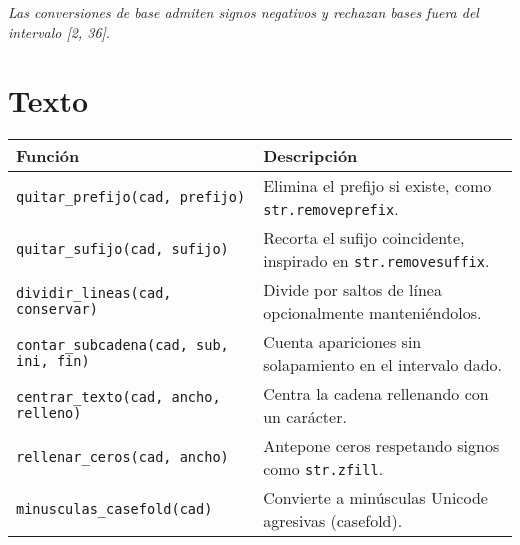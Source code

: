 \documentclass{article}
\begin{document}
\textit{Las conversiones de base admiten signos negativos y rechazan bases fuera del intervalo [2, 36].}

\section*{Texto}
\begin{tabular}{ll}
\textbf{Función} & \textbf{Descripción}\\\hline
\texttt{quitar\_prefijo(cad, prefijo)} & Elimina el prefijo si existe, como \texttt{str.removeprefix}.\\
\texttt{quitar\_sufijo(cad, sufijo)} & Recorta el sufijo coincidente, inspirado en \texttt{str.removesuffix}.\\
\texttt{dividir\_lineas(cad, conservar)} & Divide por saltos de línea opcionalmente manteniéndolos.\\
\texttt{contar\_subcadena(cad, sub, ini, fin)} & Cuenta apariciones sin solapamiento en el intervalo dado.\\
\texttt{centrar\_texto(cad, ancho, relleno)} & Centra la cadena rellenando con un carácter.\\
\texttt{rellenar\_ceros(cad, ancho)} & Antepone ceros respetando signos como \texttt{str.zfill}.\\
\texttt{minusculas\_casefold(cad)} & Convierte a minúsculas Unicode agresivas (casefold).\\
\end{tabular}
\end{document}
